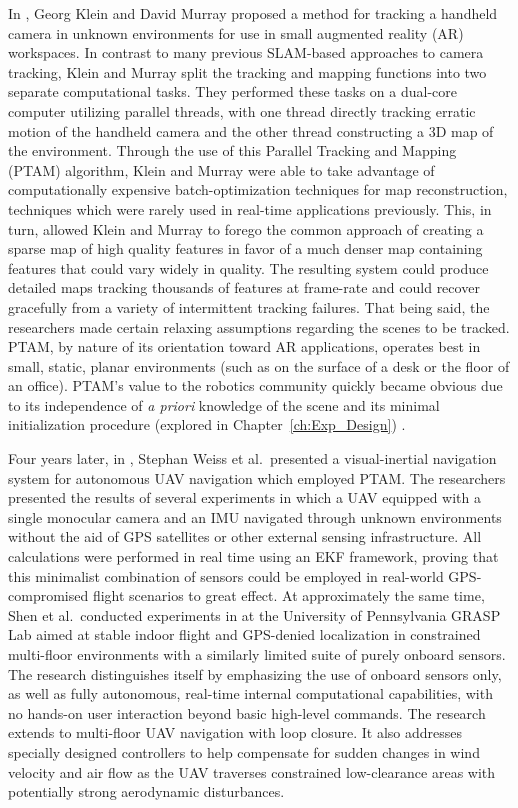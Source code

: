In \cite{Klein2007}, Georg Klein and David Murray proposed a method for tracking a handheld camera in unknown environments for use in small augmented reality (AR) workspaces. In contrast to many previous SLAM-based approaches to camera tracking, Klein and Murray split the tracking and mapping functions into two separate computational tasks. They performed these tasks on a dual-core computer utilizing parallel threads, with one thread directly tracking erratic motion of the handheld camera and the other thread constructing a 3D map of the environment. Through the use of this Parallel Tracking and Mapping (PTAM) algorithm, Klein and Murray were able to take advantage of computationally expensive batch-optimization techniques for map reconstruction, techniques which were rarely used in real-time applications previously. This, in turn, allowed Klein and Murray to forego the common approach of creating a sparse map of high quality features in favor of a much denser map containing features that could vary widely in quality. The resulting system could produce detailed maps tracking thousands of features at frame-rate and could recover gracefully from a variety of intermittent tracking failures. That being said, the researchers made certain relaxing assumptions regarding the scenes to be tracked. PTAM, by nature of its orientation toward AR applications, operates best in small, static, planar environments (such as on the surface of a desk or the floor of an office). PTAM's value to the robotics community quickly became obvious due to its independence of \textit{a priori} knowledge of the scene and its minimal initialization procedure (explored in Chapter~\ref{ch:Exp_Design}) . 

Four years later, in \cite{Weiss2011}, Stephan Weiss et al.\ presented a visual-inertial navigation system for autonomous UAV navigation which employed PTAM. The researchers presented the results of several experiments in which a UAV equipped with a single monocular camera and an IMU navigated through unknown environments without the aid of GPS satellites or other external sensing infrastructure. All calculations were performed in real time using an EKF framework, proving that this minimalist combination of sensors could be employed in real-world GPS-compromised flight scenarios to great effect. At approximately the same time, Shen et al.\ conducted experiments in \cite{Shen2011} at the University of Pennsylvania GRASP Lab aimed at stable indoor flight and GPS-denied localization in constrained multi-floor environments with a similarly limited suite of purely onboard sensors. The research distinguishes itself by emphasizing the use of onboard sensors only, as well as fully autonomous, real-time internal computational capabilities, with no hands-on user interaction beyond basic high-level commands. The research extends to multi-floor UAV navigation with loop closure. It also addresses specially designed controllers to help compensate for sudden changes in wind velocity and air flow as the UAV traverses constrained low-clearance areas with potentially strong aerodynamic disturbances.

